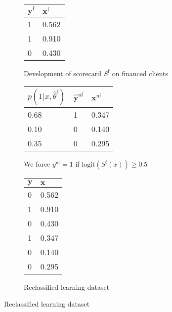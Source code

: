 \begin{figure}
{\setlength{\parindent}{0cm}
\begin{multicols}{3}

\begin{subfigure}[t]{0.31\textwidth}
\begin{center}
\begin{adjustbox}{max width=\textwidth}
\begin{tabular}{l l}
\toprule
\textbf{${\bm{y}}^{\text{f}}$} & \textbf{${\bm{x}}^{\text{f}}$}\\
\midrule
1 & 0.562 \\
1 & 0.910 \\
0 & 0.430 \\
\bottomrule
\end{tabular}
\end{adjustbox}
\end{center}

\caption{Development of scorecard $S^{\text{f}}$ on financed clients}
\label{reclass:sfig1}
\end{subfigure}


\columnbreak

\begin{subfigure}[t]{0.31\textwidth}
\begin{center}
\begin{adjustbox}{max width=\textwidth}
\begin{tabular}{l l l}
\toprule
\textbf{$p(1|x,\hat{\theta}^{\text{f}})$} & \textbf{$\hat{\bm{y}}^{\text{nf}}$} & \textbf{${\bm{x}}^{\text{nf}}$}\\
\midrule
0.68 & 1 & 0.347 \\
0.10 & 0 & 0.140 \\
0.35 & 0 & 0.295 \\
\bottomrule
\end{tabular}
\end{adjustbox}
\end{center}

\caption{We force $y^{\text{nf}}=1$ if $\text{logit}(S^{\text{f}}(x)) \geq 0.5$}
\label{reclass:sfig2}
\end{subfigure}

\columnbreak

\begin{subfigure}[t]{0.31\textwidth}
\begin{center}
\begin{adjustbox}{max width=\textwidth}
\begin{tabular}{l l}
\toprule
\textbf{${\bm{y}}$} & \textbf{${\bm{x}}$}\\
\midrule
0 & 0.562 \\
1 & 0.910 \\
0 & 0.430 \\
1 & 0.347 \\
0 & 0.140 \\
0 & 0.295 \\
\bottomrule
\end{tabular}
\end{adjustbox}
\end{center}
\caption{Reclassified learning dataset}
\label{reclass:sfig3}
\end{subfigure}


\end{multicols}}
\end{figure}
